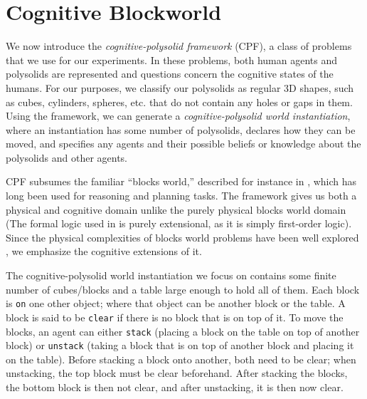 \section{Cognitive Blockworld}

We now introduce the \emph{cognitive-polysolid framework} (CPF), a
class of problems that we use for our experiments. In these problems,
both human agents and polysolids are represented and questions concern the
cognitive states of the humans. For our purposes,
we classify our polysolids as regular 3D shapes, such as cubes, cylinders, spheres, etc.
that do not contain any holes or gaps in them. Using
the framework, we can generate a \emph{cognitive-polysolid world
instantiation}, where an instantiation has some number of polysolids,
declares how they can be moved, and specifies any agents and their possible
beliefs or knowledge about the polysolids and other agents.

CPF subsumes the familiar ``blocks world,'' described for instance in
\cite{nilsson_principles_1982}, which has long been used for reasoning and
planning tasks.  The framework gives us both a physical and cognitive
domain unlike the purely physical blocks world domain (The formal
logic used in \cite{nilsson_principles_1982} is purely extensional, as it is
simply first-order logic).  Since the physical complexities of blocks
world problems have been well explored
\cite{gupta_complexity_1992,slaney_blocks_2001}, we emphasize the cognitive extensions
of it.

The cognitive-polysolid world instantiation we focus on contains some finite number
of cubes/blocks and a table large enough to hold all of them.  Each block is
\texttt{on} one other object; where that object can be another block or the
table.  A block is said to be \texttt{clear} if there is no block that
is on top of it.  To move the blocks, an agent can either
\texttt{stack} (placing a block on the table on top of another block)
or \texttt{unstack} (taking a block that is on top of another block
and placing it on the table).  Before stacking a block onto another, both need
to be clear; when unstacking, the top block must be clear beforehand.
After stacking the blocks, the bottom block is then not clear, and
after unstacking, it is then now clear.

